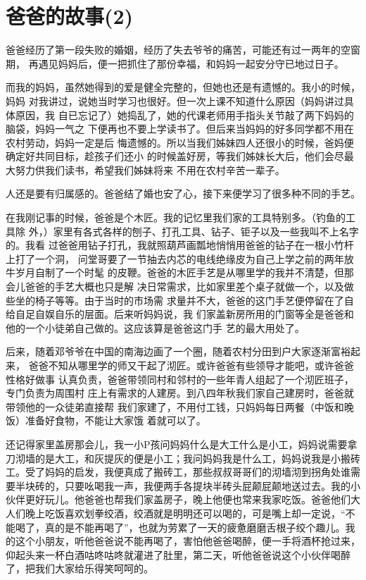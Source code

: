 \documentclass[12pt]{book}
\begin{document}
\section{爸爸的故事(2)}
\label{sec-9-16}

爸爸经历了第一段失败的婚姻，经历了失去爷爷的痛苦，可能还有过一两年的空窗期，
再遇见妈妈后，便一把抓住了那份幸福，和妈妈一起安分守已地过日子。

而我的妈妈，虽然她得到的爱是健全完整的，但她也还是有遗憾的。我小的时候，妈妈
对我讲过，说她当时学习也很好。但一次上课不知道什么原因（妈妈讲过具体原因，我
自已忘记了）她捣乱了，她的代课老师用手指头关节敲了两下妈妈的脑袋，妈妈一气之
下便再也不要上学读书了。但后来当妈妈的好多同学都不用在农村劳动，妈妈一定是后
悔遗憾的。所以当我们姊妹四人还很小的时候，爸妈便确定好共同目标，趁孩子们还小
的时候盖好房，等我们姊妹长大后，他们会尽最大努力供我们读书，希望我们姊妹将来
不用在农村辛苦一辈子。

人还是要有归属感的。爸爸结了婚也安了心，接下来便学习了很多种不同的手艺。

在我刚记事的时候，爸爸是个木匠。我的记忆里我们家的工具特别多。（钓鱼的工具除
外，）家里有各式各样的刨子、打孔工具、钻子、钜子以及一些我叫不上名字的。我看
过爸爸用钻子打孔，我就照葫芦画瓢地悄悄用爸爸的钻子在一根小竹杆上打了一个洞，
问堂哥要了一节抽去内芯的电线绝缘皮为自己上学之前的两年放牛岁月自制了一个时髦
的皮鞭。爸爸的木匠手艺是从哪里学的我并不清楚，但那会儿爸爸的手艺大概也只是解
决日常需求，比如家里差个桌子就做一个，以及做些坐的椅子等等。由于当时的市场需
求量并不大，爸爸的这门手艺便停留在了自给自足自娱自乐的层面。后来听妈妈说，我
们家盖新房所用的门窗等全是爸爸和他的一个小徒弟自己做的。这应该算是爸爸这门手
艺的最大用处了。

后来，随着邓爷爷在中国的南海边画了一个圈，随着农村分田到户大家逐渐富裕起来，
爸爸不知从哪里学的师又干起了沏匠。或许爸爸有些领导才能吧，或许爸爸性格好做事
认真负责，爸爸带领同村和邻村的一些年青人组起了一个沏匠班子，专门负责为周围村
庄上有需求的人建房。到八四年秋我们家自己建房时，爸爸就带领他的一众徒弟直接帮
我们家建了，不用付工钱，只妈妈每日两餐（中饭和晚饭）准备好食物，不能让大家饿
着就可以了。

还记得家里盖房那会儿，我一小P孩问妈妈什么是大工什么是小工，妈妈说需要拿刀沏墙的是大工，和灰提灰的便是小工；我问妈妈我是什么工，妈妈说我是小搬砖工。受了妈妈的启发，我便真成了搬砖工，那些叔叔哥哥们的沏墙沏到拐角处谁需要半块砖的，只要吆喝我一声，我便两手各提块半砖头屁颠屁颠地送过去。我的小伙伴更好玩儿。他爸爸也帮我们家盖房子，晚上他便也常来我家吃饭。爸爸他们大人们晚上吃饭喜欢划拳绞酒，绞酒就是明明还可以喝的，可是嘴上却一定说，“不能喝了，真的是不能再喝了”，也就为劳累了一天的疲惫磨磨舌根子绞个趣儿。我的这个小朋友，听他爸爸说不能再喝了，害怕他爸爸喝醉，便一手将酒杯抢过来，仰起头来一杯白酒咕咚咕咚就灌进了肚里，第二天，听他爸爸说这个小伙伴喝醉了，把我们大家给乐得笑呵呵的。
\end{document}
